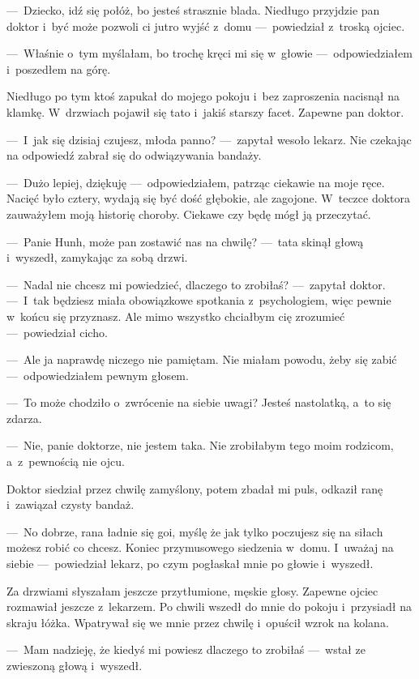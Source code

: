 ---~Dziecko, idź się połóż, bo jesteś strasznie blada. Niedługo przyjdzie pan doktor i~być może pozwoli ci jutro wyjść z~domu ---~powiedział z~troską ojciec.

---~Właśnie o~tym myślałam, bo trochę kręci mi się w~głowie ---~odpowiedziałem i~poszedłem na górę. 

Niedługo po tym ktoś zapukał do mojego pokoju i~bez zaproszenia nacisnął na klamkę. W~drzwiach pojawił się tato i~jakiś starszy facet. Zapewne pan doktor. 

---~I~jak się dzisiaj czujesz, młoda panno? ---~zapytał wesoło lekarz. Nie czekając na odpowiedź zabrał się do odwiązywania bandaży.

---~Dużo lepiej, dziękuję ---~odpowiedziałem, patrząc ciekawie na moje ręce. Nacięć było cztery, wydają się być dość głębokie, ale zagojone. W~teczce doktora zauważyłem moją historię choroby. Ciekawe czy będę mógł ją przeczytać. 

---~Panie Hunh, może pan zostawić nas na chwilę? ---~tata skinął głową i~wyszedł, zamykając za sobą drzwi.

---~Nadal nie chcesz mi powiedzieć, dlaczego to zrobiłaś? ---~zapytał doktor. ---~I~tak będziesz miała obowiązkowe spotkania z~psychologiem, więc pewnie w~końcu się przyznasz. Ale mimo wszystko chciałbym cię zrozumieć ---~powiedział cicho.

---~Ale ja naprawdę niczego nie pamiętam. Nie miałam powodu, żeby się zabić ---~odpowiedziałem pewnym głosem.

---~To może chodziło o~zwrócenie na siebie uwagi? Jesteś nastolatką, a~to się zdarza.

---~Nie, panie doktorze, nie jestem taka. Nie zrobiłabym tego moim rodzicom, a~z~pewnością nie ojcu.

Doktor siedział przez chwilę zamyślony, potem zbadał mi puls, odkaził ranę i~zawiązał czysty bandaż.

---~No dobrze, rana ładnie się goi, myślę że jak tylko poczujesz się na siłach możesz robić co chcesz. Koniec przymusowego siedzenia w~domu. I~uważaj na siebie ---~powiedział lekarz, po czym pogłaskał mnie po głowie i~wyszedł. 

Za drzwiami słyszałam jeszcze przytłumione, męskie głosy. Zapewne ojciec rozmawiał jeszcze z~lekarzem. Po chwili wszedł do mnie do pokoju i~przysiadł na skraju łóżka. Wpatrywał się we mnie przez chwilę i~opuścił wzrok na kolana.

---~Mam nadzieję, że kiedyś mi powiesz dlaczego to zrobiłaś ---~wstał ze zwieszoną głową i~wyszedł.

